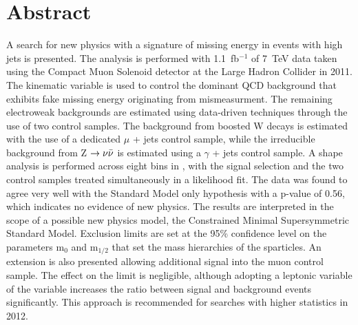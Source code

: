 \chapter*{Abstract}
\noindent 
\vspace{0mm}
\normalsize

A search for new physics with a signature of missing energy in events with high \Pt jets is presented. The analysis is performed with 1.1~fb$^{-1}$ of 7~TeV data taken using the Compact Muon Solenoid detector at the Large Hadron Collider in 2011. The kinematic variable \alt is used to control the dominant QCD background that exhibits fake missing energy originating from mismeasurment. The remaining electroweak backgrounds are estimated using data-driven techniques through the use of two control samples. The background from boosted W decays is estimated with the use of a dedicated $\mu$ + jets control sample, while the irreducible background from Z $\rightarrow \nu \bar{\nu}$ is estimated using a $\gamma$ + jets control sample.  A shape analysis is performed across eight bins in \HT, with the signal selection and the two control samples treated simultaneously in a likelihood fit.  The data was found to agree very well with the Standard Model only hypothesis with a p-value of 0.56, which indicates no evidence of new physics. The results are interpreted in the scope of a possible new physics model, the Constrained Minimal Supersymmetric Standard Model. Exclusion limits are set at the 95\% confidence level on the parameters m$_{0}$ and m$_{1/2}$ that set the mass hierarchies of the sparticles. An extension is also presented allowing additional signal into the muon control sample. The effect on the limit is negligible, although adopting a leptonic variable of the \alt variable increases the ratio between signal and background events significantly. This approach is recommended for searches with higher statistics in 2012. 



